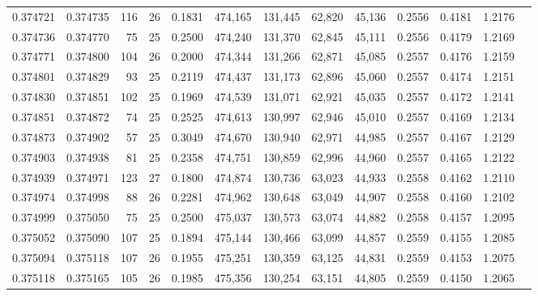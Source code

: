 \begin{tabular}{rrrrrrrrrrrrr}
0.374721 & 0.374735 &   116 &  26 &                                     0.1831 & 474,165 & 131,445 &  62,820 &  45,136 & 0.2556 & 0.4181 & 1.2176 \\
0.374736 & 0.374770 &    75 &  25 &                                     0.2500 & 474,240 & 131,370 &  62,845 &  45,111 & 0.2556 & 0.4179 & 1.2169 \\
0.374771 & 0.374800 &   104 &  26 &                                     0.2000 & 474,344 & 131,266 &  62,871 &  45,085 & 0.2557 & 0.4176 & 1.2159 \\
0.374801 & 0.374829 &    93 &  25 &                                     0.2119 & 474,437 & 131,173 &  62,896 &  45,060 & 0.2557 & 0.4174 & 1.2151 \\
0.374830 & 0.374851 &   102 &  25 &                                     0.1969 & 474,539 & 131,071 &  62,921 &  45,035 & 0.2557 & 0.4172 & 1.2141 \\
0.374851 & 0.374872 &    74 &  25 &                                     0.2525 & 474,613 & 130,997 &  62,946 &  45,010 & 0.2557 & 0.4169 & 1.2134 \\
0.374873 & 0.374902 &    57 &  25 &                                     0.3049 & 474,670 & 130,940 &  62,971 &  44,985 & 0.2557 & 0.4167 & 1.2129 \\
0.374903 & 0.374938 &    81 &  25 &                                     0.2358 & 474,751 & 130,859 &  62,996 &  44,960 & 0.2557 & 0.4165 & 1.2122 \\
0.374939 & 0.374971 &   123 &  27 &                                     0.1800 & 474,874 & 130,736 &  63,023 &  44,933 & 0.2558 & 0.4162 & 1.2110 \\
0.374974 & 0.374998 &    88 &  26 &                                     0.2281 & 474,962 & 130,648 &  63,049 &  44,907 & 0.2558 & 0.4160 & 1.2102 \\
0.374999 & 0.375050 &    75 &  25 &                                     0.2500 & 475,037 & 130,573 &  63,074 &  44,882 & 0.2558 & 0.4157 & 1.2095 \\
0.375052 & 0.375090 &   107 &  25 &                                     0.1894 & 475,144 & 130,466 &  63,099 &  44,857 & 0.2559 & 0.4155 & 1.2085 \\
0.375094 & 0.375118 &   107 &  26 &                                     0.1955 & 475,251 & 130,359 &  63,125 &  44,831 & 0.2559 & 0.4153 & 1.2075 \\
0.375118 & 0.375165 &   105 &  26 &                                     0.1985 & 475,356 & 130,254 &  63,151 &  44,805 & 0.2559 & 0.4150 & 1.2065 \\

\end{tabular}
